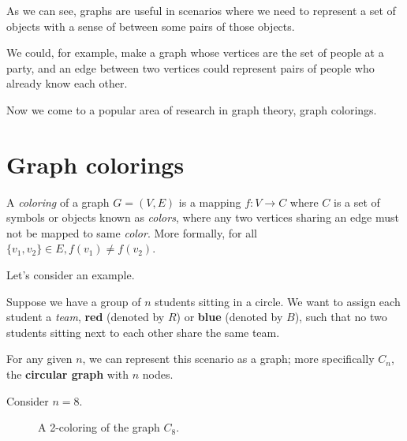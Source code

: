 \documentclass[12pt]{exam}
\begin{document}
As we can see, graphs are useful in scenarios where we need to represent a set of objects with a sense of  between some pairs of those objects.

We could, for example, make a graph whose vertices are the set of people at a party, and an edge between two vertices could represent pairs of people who already know each other.

Now we come to a popular area of research in graph theory, graph colorings.

\section {Graph colorings}

A \emph{coloring} of a graph $G=(V,E)$ is a mapping $f:V \rightarrow C$ where $C$ is a set of symbols or objects known as \emph{colors}, where any two vertices sharing an edge must not be mapped to same \emph{color}. More formally, for all $\{v_1, v_2\} \in E, f(v_1) \neq f(v_2)$.

Let's consider an example. 

Suppose we have a group of $n$ students sitting in a circle. We want to assign each student a \emph{team}, \textbf{red} (denoted by $R$) or \textbf{blue} (denoted by $B$), such that no two students sitting next to each other share the same team.

For any given $n$, we can represent this scenario as a graph; more specifically $C_n$, the  \textbf{circular graph} with $n$ nodes.

Consider $n=8$.

\begin{figure}[h]

    \centering
    

    \caption{A 2-coloring of the graph $C_8$.}
    
\end{figure}
\end{document}
